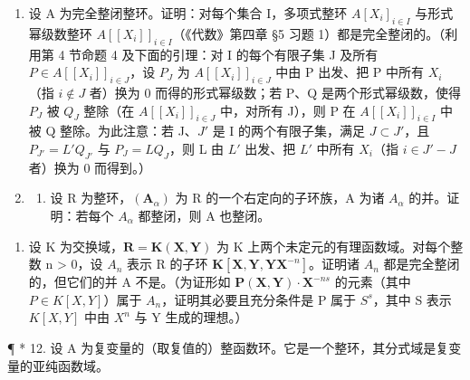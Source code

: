 \begin{enumerate}
  证明商整环 \(\mathbf{Z}[\mathbf{X}] / (\mathbf{X}^2 +4)\) 不是整闭的，尽管 \(\mathbf{Z}[\mathbf{X}]\) 是整闭的。
\item
  设 A 为完全整闭整环。证明：对每个集合 I，多项式整环 \(A[X_{i}]_{i \in I}\) 与形式幂级数整环 \(A[[X_{i}]]_{i \in I}\)（《代数》第四章 §5 习题 1）都是完全整闭的。（利用第 4 节命题 4 及下面的引理：对 I 的每个有限子集 J 及所有 \(P \in A[[X_{i}]]_{i \in J}\)，设 \(P_{J}\) 为 \(A[[X_{i}]]_{i \in J}\) 中由 P 出发、把 P 中所有 \(X_{i}\)（指 \(i \notin J\) 者）换为 0 而得的形式幂级数；若 P、Q 是两个形式幂级数，使得 \(P_{J}\) 被 \(Q_{J}\) 整除（在 \(A[[X_{i}]]_{i \in J}\) 中，对所有 J），则 P 在 \(A[[X_{i}]]_{i \in I}\) 中被 Q 整除。为此注意：若 J、\(J'\) 是 I 的两个有限子集，满足 \(J \subset J'\)，且 \(P_{J'} = L'Q_{J'}\) 与 \(P_{J} = LQ_{J}\)，则 L 由 \(L'\) 出发、把 \(L'\) 中所有 \(X_{i}\)（指 \(i \in J' - J\) 者）换为 0 而得到。）
\item
  \begin{enumerate}
  \def\labelenumii{(\alph{enumii})}
  \tightlist
  \item
    设 R 为整环，\((\mathbf{A}_{\alpha})\) 为 R 的一个右定向的子环族，A 为诸 \(A_{\alpha}\) 的并。证明：若每个 \(A_{\alpha}\) 都整闭，则 A 也整闭。
  \end{enumerate}
\end{enumerate}

\begin{enumerate}
\def\labelenumi{(\alph{enumi})}
\setcounter{enumi}{1}
\tightlist
\item
  设 K 为交换域，\(\mathbf{R} = \mathbf{K}(\mathbf{X}, \mathbf{Y})\) 为 K 上两个未定元的有理函数域。对每个整数 n \textgreater{} 0，设 \(A_{n}\) 表示 R 的子环 \(\mathbf{K}[\mathbf{X}, \mathbf{Y}, \mathbf{Y}\mathbf{X}^{-n}]\)。证明诸 \(A_{n}\) 都是完全整闭的，但它们的并 A 不是。（为证形如 \(\mathbf{P}(\mathbf{X}, \mathbf{Y}) \cdot \mathbf{X}^{-ns}\) 的元素（其中 \(P \in K[X, Y]\)）属于 \(A_{n}\)，证明其必要且充分条件是 P 属于 \(S^{s}\)，其中 S 表示 \(K[X, Y]\) 中由 \(X^{n}\) 与 Y 生成的理想。）
\end{enumerate}

¶ * 12. 设 A 为复变量的（取复值的）整函数环。它是一个整环，其分式域是复变量的亚纯函数域。

